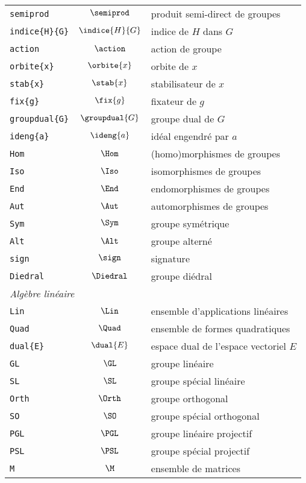 \documentclass[print]{atomathematyk}
\begin{document}
\begin{longtable}{lcl}
  \texttt{semiprod} & \(\semiprod\) & produit semi-direct de groupes\\
  \texttt{indice\{H\}\{G\}} & \(\indice{H}{G}\) & indice de \(H\) dans \(G\)\\
  \texttt{action} & \(\action\) & action de groupe\\
  \texttt{orbite\{x\}} & \(\orbite{x}\) & orbite de \(x\)\\
  \texttt{stab\{x\}} & \(\stab{x}\) & stabilisateur de \(x\)\\
  \texttt{fix\{g\}} & \(\fix{g}\) & fixateur de \(g\)\\
  \texttt{groupdual\{G\}} & \(\groupdual{G}\) & groupe dual de \(G\)\\
  \texttt{ideng\{a\}} & \(\ideng{a}\) & idéal engendré par \(a\)\\
  \texttt{Hom} & \(\Hom\) & (homo)morphismes de groupes \\
  \texttt{Iso} & \(\Iso\) & isomorphismes de groupes \\
  \texttt{End} & \(\End\) & endomorphismes de groupes \\
  \texttt{Aut} & \(\Aut\) & automorphismes de groupes \\
  \texttt{Sym} & \(\Sym\) & groupe symétrique\\
  \texttt{Alt} & \(\Alt\) & groupe alterné\\
  \texttt{sign} & \(\sign\) & signature\\
  \texttt{Diedral} & \(\Diedral\) & groupe diédral\\
  \multicolumn{3}{l}{\emph{Algèbre linéaire}}\\
  \texttt{Lin} & \(\Lin\) & ensemble d’applications linéaires\\
  \texttt{Quad} & \(\Quad\) & ensemble de formes quadratiques\\
  \texttt{dual\{E\}} & \(\dual{E}\) & espace dual de l’espace vectoriel \(E\)\\
  \texttt{GL} & \(\GL\) & groupe linéaire\\
  \texttt{SL} & \(\SL\) & groupe spécial linéaire\\
  \texttt{Orth} & \(\Orth\) & groupe orthogonal\\
  \texttt{SO} & \(\SO\) & groupe spécial orthogonal\\
  \texttt{PGL} & \(\PGL\) & groupe linéaire projectif\\
  \texttt{PSL} & \(\PSL\) & groupe spécial projectif\\
  \texttt{M} & \(\M\) & ensemble de matrices\\

\end{longtable}
\end{document}
